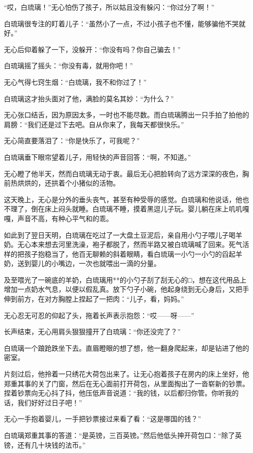 ``哎，白琉璃！''无心怕伤了孩子，所以姑且没有躲闪：``你过分了啊！''

白琉璃很专注的盯着儿子：``虽然小了一点，不过小孩子也不懂，能够骗他不哭就好。''

无心后仰着躲了一下，没躲开：``你没有吗？你自己骗去！''

白琉璃摇了摇头：``你没有毒，就用你吧！''

无心气得七窍生烟：``白琉璃，我不和你过了！''

白琉璃这才抬头面对了他，满脸的莫名其妙：``为什么？''

无心张口结舌，因为原因太多，一时也不能尽数。而白琉璃腾出一只手拍了拍他的肩膀：``我们还是过下去吧。自从你来了，我每天都很快乐。''

无心简直要落泪了：``你是快乐了，可我呢？''

白琉璃垂下眼帘望着儿子，用轻快的声音回答：``啊，不知道。''

无心瞪了他半天，然而白琉璃无动于衷。最后无心把脸转向了远方深深的夜色，胸前热烘烘的，还拱着个小猪似的活物。

这天晚上，无心是分外的垂头丧气，甚至有种受辱的感觉。白琉璃和他说话，他也不理了，倒在床上闷头就睡。白琉璃不睡，摸着黑逗儿子玩。婴儿躺在床上叽叽嘎嘎，声音不高，有种心平气和的乖。

如此到了翌日天明，白琉璃在吃过了一大盘土豆泥后，亲自用小勺子喂儿子喝羊奶。无心本来想去河里洗澡，袍子都脱了，然而半路又被白琉璃喊了回来。死气活样的把孩子抱稳当了，他百无聊赖的斜着眼睛，看白琉璃一小勺一小勺的舀起羊奶，送到婴儿的小嘴边，一次也就喂出一滴的分量。

及至喂光了一碗底的羊奶，白琉璃用**的小勺子刮了刮无心的□，想在这代用品上增加一点奶水气息，以便以假乱真。放下勺子小碗，他起身绕到无心身后，又把手伸到前方，在对方胸膛上捏起了一把肉：``儿子，看，妈妈。''

无心忍无可忍的仰起了头，拖着长声表示抱怨：``哎——呀——''

长声结束，无心用肩头狠狠撞开了白琉璃：``你还没完了？''

白琉璃一个踉跄跌坐下去。直眉瞪眼的想了想，他一翻身爬起来，却是钻进了他的密室。

片刻过后，他拎着一只绣花大荷包出来了。让无心抱着孩子在房内的床上坐好，他郑重其事的关了门窗，然后在无心面前打开荷包，从里面掏出了一沓崭新的钞票。捏着钞票向无心抖了抖，他压低声音说道：``我的钱，以后都归你管。你听我的话，我们好好过日子吧！''

无心一手抱着婴儿，一手把钞票接过来看了看：``这是哪国的钱？''

白琉璃郑重其事的答道：``是英镑，三百英镑。''然后他低头抻开荷包口：``除了英镑，还有几十块钱的法币。''

